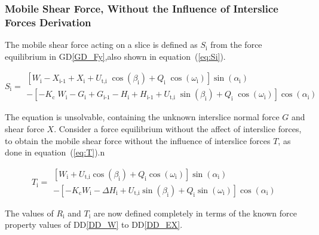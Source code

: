 \documentclass[12pt]{article}
\newcommand{\ddref}[1]{DD\ref{#1}}
\newcommand{\dref}[1]{GD\ref{#1}}
\begin{document}
\subsubsection*{Mobile Shear Force, Without the
  Influence of Interslice Forces Derivation}

\noindent
The mobile shear force acting on a slice is defined as $S_\text{i}$
from the force equilibrium in \dref{GD_Fy},also shown in
equation~(\ref{eq:Si}).

\begin{equation}  \label{eq:Si}
  S_{\text{i}} = \begin{array}{l} \left[ W_{\text{i}} -X_{\text{i-1}}
      + X_{\text{i}} +
      {U_{\text{t,i}}}\;{\cos\left(\beta_{\text{i}}\right)} +
      Q_{\text{i}}\;{\cos\left(\omega_{\text{i}}\right)}
      \right]\sin\left(\alpha_{\text{i}}\right) \\ - \left[
      {-K_{\text{c}}}\;{W_{\text{i}}} - G_{\text{i}} + G_{\text{i-1}}
      - H_{\text{i}} + H_{\text{i-1}} +
      {U_{\text{t,i}}}\;{\sin\left(\beta_{\text{i}}\right)} +
      Q_{\text{i}}\;{\cos\left(\omega_{\text{i}}\right)}
      \right]\cos\left(\alpha_{\text{i}}\right) \end{array}
\end{equation}

\noindent
The equation is unsolvable, containing the unknown interslice normal
force $G$ and shear force $X$.  Consider a force equilibrium without
the affect of interslice forces, to obtain the mobile shear force
without the influence of interslice forces $T$, as done in
equation~(\ref{eq:T}).n

\begin{equation}  \label{eq:T} T_{\text{i}} =
  \begin{array}{l}  
\left[ W_{\text{i}} + U_{\text{t,i}} \cos\left(\beta_{\text{i}}\right)
  + Q_{\text{i}} \cos\left(\omega_{\text{i}}\right) \right]
\sin\left(\alpha_{\text{i}}\right) \\ - \left[ - K_{\text{c}}
  W_{\text{i}} - \Delta H_{\text{i}} + U_{\text{t,i}}
  \sin\left(\beta_{\text{i}}\right) + Q_{\text{i}}
  \sin\left(\omega_{\text{i}}\right) \right]
\cos\left(\alpha_{\text{i}}\right) \end{array}
\end{equation}

\noindent
The values of $R_\text{i}$ and $T_\text{i}$ are now defined completely
in terms of the known force property values of \ddref{DD_W} to
\ddref{DD_EX}.

~\newline
\end{document}
